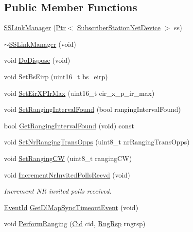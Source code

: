 \subsection*{Public Member Functions}
\begin{DoxyCompactItemize}
\item 
\hyperlink{classns3_1_1SSLinkManager_afa14e5d2bb23ba277dbace82e8254a73}{S\+S\+Link\+Manager} (\hyperlink{classns3_1_1Ptr}{Ptr}$<$ \hyperlink{classns3_1_1SubscriberStationNetDevice}{Subscriber\+Station\+Net\+Device} $>$ ss)
\item 
\hyperlink{classns3_1_1SSLinkManager_aa4a4c762c94d5de7f50c3becd013cead}{$\sim$\+S\+S\+Link\+Manager} (void)
\item 
void \hyperlink{classns3_1_1SSLinkManager_abd311c2e363e66b6984b816358d59c2b}{Do\+Dispose} (void)
\item 
void \hyperlink{classns3_1_1SSLinkManager_a1fb077262d6907a094da137293adf01b}{Set\+Bs\+Eirp} (uint16\+\_\+t bs\+\_\+eirp)
\item 
void \hyperlink{classns3_1_1SSLinkManager_a000856beb04232a04246e2cb840c5cc4}{Set\+Eir\+X\+P\+Ir\+Max} (uint16\+\_\+t eir\+\_\+x\+\_\+p\+\_\+ir\+\_\+max)
\item 
void \hyperlink{classns3_1_1SSLinkManager_a2a26605589e5f9edf8e7584fd475c1d8}{Set\+Ranging\+Interval\+Found} (bool ranging\+Interval\+Found)
\item 
bool \hyperlink{classns3_1_1SSLinkManager_a3813dc33ffee6250db6da234f885059d}{Get\+Ranging\+Interval\+Found} (void) const 
\item 
void \hyperlink{classns3_1_1SSLinkManager_a7c9410050592f0605c9e587bd04eb452}{Set\+Nr\+Ranging\+Trans\+Opps} (uint8\+\_\+t nr\+Ranging\+Trans\+Opps)
\item 
void \hyperlink{classns3_1_1SSLinkManager_aff35b663260644c8af1b4085d5fef536}{Set\+Ranging\+CW} (uint8\+\_\+t ranging\+CW)
\item 
void \hyperlink{classns3_1_1SSLinkManager_a5021f5083b69a2c8cd606501b26d5409}{Increment\+Nr\+Invited\+Polls\+Recvd} (void)
\begin{DoxyCompactList}\small\item\em Increment NR invited polls received. \end{DoxyCompactList}\item 
\hyperlink{classns3_1_1EventId}{Event\+Id} \hyperlink{classns3_1_1SSLinkManager_a57c1d5c4e60d9a3c49c4f11605497fbd}{Get\+Dl\+Map\+Sync\+Timeout\+Event} (void)
\item 
void \hyperlink{classns3_1_1SSLinkManager_acd42fe66d1a247c52410fb6082e994d1}{Perform\+Ranging} (\hyperlink{classns3_1_1Cid}{Cid} cid, \hyperlink{classns3_1_1RngRsp}{Rng\+Rsp} rngrsp)

\end{DoxyCompactItemize}
